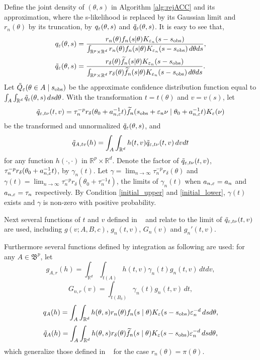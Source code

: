 \documentclass[9pt]{article}
\theoremstyle{remark}
\begin{document}
Define the joint density of $(\theta,s)$ in Algorithm \ref{alg:rejACC} and its approximation, where the s-likelihood is replaced by its Gaussian
limit and $r_{n}(\theta)$ by its truncation, by $q_{\varepsilon}(\theta,s)$
and $\tilde{q}_{\varepsilon}(\theta,s)$. It is easy to see that,
\begin{align*}
q_{\varepsilon}(\theta,s) & =\frac{r_{n}(\theta)f_{n}(s|\theta)K_{\varepsilon_{n}}(s-s_{\rm obs})}{\int_{\mathbb{R}^{p}\times\mathbb{R}^{d}}r_{n}(\theta)f_{n}(s|\theta)K_{\varepsilon_{n}}(s-s_{\rm obs})\,d\theta ds},\\
\tilde{q}_{\varepsilon}(\theta,s) & =\frac{r_{\delta}(\theta)\widetilde{f}_{n}(s|\theta)K_{\varepsilon_{n}}(s-s_{\rm obs})}{\int_{\mathbb{R}^{p}\times\mathbb{R}^{d}}r_{\delta}(\theta)\widetilde{f}_{n}(s|\theta)K_{\varepsilon_{n}}(s-s_{\rm obs})\,d\theta ds}.
\end{align*}
Let $\tilde{Q}_{\varepsilon}(\theta\in A\mid s_{\rm obs})$ be the approximate confidence distribution function equal to $\int_{A}\int_{\mathbb{R}^{d}}\tilde{q}_{\varepsilon}(\theta,s)\,dsd\theta$.
With the transformation $t=t(\theta)$ and $v=v(s)$, let $$\tilde{q}_{\varepsilon,t\nu}(t,v)=\tau_{n}^{-p}r_{\delta}(\theta_0+a_{n,\varepsilon}^{-1}t)\widetilde{f}_{n}(s_{\rm obs}+\varepsilon_{n}\nu\mid\theta_0+a_{n,\varepsilon}^{-1}t)K_{\varepsilon}(\nu)$$
be the transformed and unnormalized $\tilde{q}_{\varepsilon}(\theta,s)$, and
$$\tilde{q}_{A,tv}(h)=\int_{A}\int_{\mathbb{R}^{d}}h(t,v)\tilde{q}_{\varepsilon,t\nu}(t,v)\,dvdt$$
for any function $h(\cdot,\cdot)$ in $\mathbb{R}^{p}\times\mathbb{R}^{d}$.
Denote the factor of $\tilde{q}_{\varepsilon,t\nu}(t,v)$, $\tau_{n}^{-p}r_{\delta}(\theta_0+a_{n,\varepsilon}^{-1}t)$,
by $\gamma_{n}(t)$. Let $\gamma=\lim_{n\rightarrow\infty}\tau_{n}^{-p}r_{\delta}(\theta)$
and $\gamma(t)=\lim_{n\rightarrow\infty}\tau_{n}^{-p}r_{\delta}(\theta_0+\tau_{n}^{-1}t)$,
the limits of $\gamma_{n}(t)$ when $a_{n,\varepsilon}=a_{n}$ and
$a_{n,\varepsilon}=\tau_{n}$ respectively. By Condition \ref{initial_upper} and \ref{initial_lower},
$\gamma(t)$ exists and $\gamma$ is non-zero with positive probability.


Next several functions of $t$ and $v$ defined in ~\cite[proofs for Section 3.1]{Li2017}
and relate to the limit of $\tilde{q}_{\varepsilon,t\nu}(t,v)$ are used, including
$g(v;A,B,c)$, $g_{n}(t,v)$, $G_{n}(v)$ and $g_{n}'(t,v)$. 

Furthermore
several functions defined by integration as following are used: for
any $A\in\mathfrak{B}^{p}$, let $$g_{A,r}(h)=\int_{\mathbb{R}^{d}}\int_{t(A)}h(t,v)\gamma_{n}(t)g_{n}(t,v)\,dtdv,$$
$$G_{n,r}(v)=\int_{t(B_{\delta})}\gamma_{n}(t)g_{n}(t,v)\,dt,$$ 
$$q_{A}(h)=\int_{A}\int_{\mathbb{R}^{d}}h(\theta,s)r_{n}(\theta)f_{n}(s\mid\theta)K_{\varepsilon}(s-s_{\rm obs})\varepsilon_{n}^{-d}\,dsd\theta,$$
$$\tilde{q}_{A}(h)=\int_{A}\int_{\mathbb{R}^{d}}h(\theta,s)r_{\delta}(\theta)\widetilde{f}_{n}(s\mid\theta)K_{\varepsilon}(s-s_{\rm obs})\varepsilon_{n}^{-d}\,dsd\theta,$$
which generalize those defined in ~\cite[proofs for Section 3.1]{Li2017}
for the case $r_{n}(\theta)=\pi(\theta)$. 
\end{document}

